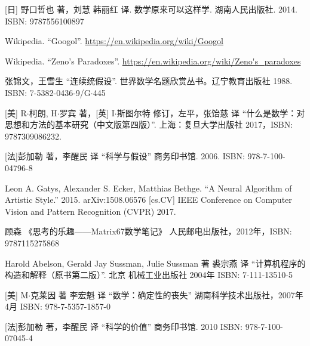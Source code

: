 \documentclass{article}
\begin{document}
\begin{thebibliography}{99}
[日] 野口哲也 著，刘慧 韩丽红 译. 数学原来可以这样学. 湖南人民出版社. 2014. ISBN: 9787556100897

Wikipedia. ``Googol''. \url{https://en.wikipedia.org/wiki/Googol}

Wikipedia. ``Zeno's Paradoxes''. \url{https://en.wikipedia.org/wiki/Zeno's_paradoxes}

张锦文，王雪生 ``连续统假设''. 世界数学名题欣赏丛书。辽宁教育出版社 1988. ISBN: 7-5382-0436-9/G$\cdot$445

[美] R$\cdot$柯朗, H$\cdot$罗宾 著，[英] I$\cdot$斯图尔特 修订，左平，张饴慈 译 ``什么是数学：对思想和方法的基本研究（中文版第四版）''. 上海：复旦大学出版社 2017，ISBN: 9787309086232.


[法]彭加勒 著，李醒民 译 ``科学与假设'' 商务印书馆. 2006. ISBN: 978-7-100-04796-8

Leon A. Gatys, Alexander S. Ecker, Matthias Bethge. ``A Neural Algorithm of Artistic Style.'' 2015. arXiv:1508.06576 [cs.CV] IEEE Conference on Computer Vision and Pattern Recognition (CVPR) 2017.

顾森 《思考的乐趣——Matrix67数学笔记》 人民邮电出版社，2012年，ISBN: 9787115275868

Harold Abelson, Gerald Jay Sussman, Julie Sussman 著 裘宗燕 译 ``计算机程序的构造和解释（原书第二版）''. 北京 机械工业出版社 2004年 ISBN: 7-111-13510-5

[美] M$\cdot$克莱因 著 李宏魁 译 ``数学：确定性的丧失'' 湖南科学技术出版社，2007年4月 ISBN: 978-7-5357-1857-0

[法]彭加勒 著，李醒民 译 ``科学的价值'' 商务印书馆. 2010 ISBN: 978-7-100-07045-4

\end{thebibliography}

\ifx\wholebook\relax \else

\expandafter\enddocument

\fi
\end{document}
